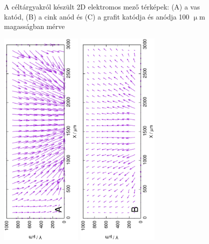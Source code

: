 \begin{figure}
\caption{A céltárgyakról készült 2D elektromos mező térképek:
(A) a vas katód, (B) a cink anód és (C) a grafit katódja és anódja 100 $\upmu$m magasságban mérve}
\label{fig:field_h1}
\end{figure}

\begin{figure}
\centering
\includegraphics[width=0.35\textwidth, angle=-90]{img/mérések/Fe1_v.eps}
\includegraphics[width=0.35\textwidth, angle=-90]{img/mérések/Zn1_v.eps}

\end{figure}
